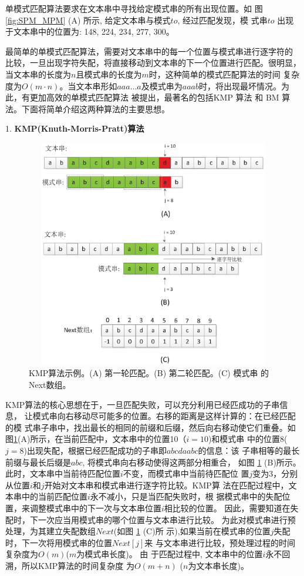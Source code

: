 单模式匹配算法要求在文本串中寻找给定模式串的所有出现位置。如
图 \ref{fig:SPM_MPM} (A) 所示, 给定文本串与模式$to$, 经过匹配发现，模
式串$to$ 出现于文本串中的位置为: 148, 224, 234, 277, 300。

最简单的单模式匹配算法，需要对文本串中的每一个位置与模式串进行逐字符的
比较，一旦出现字符失配，将直接移动到文本串的下一个位置进行匹配。很明显，
当文本串的长度为$n$且模式串的长度为$m$时，这种简单的模式匹配算法的时间
复杂度为$O(m \cdot
n)$。当文本串形如$aaa \dots
a$及模式串为$aaab$时，将出现最坏情况。为此，有更加高效的单模式匹配算法
被提出，最著名的包括KMP \cite{Knuth1977}算法 和 BM \cite{Boyer1977} 算
法。下面将简单介绍这两种算法的主要思想。

1. \textbf{KMP(Knuth-Morris-Pratt)算法}

\begin{figure}[H]
  \centering
  \includegraphics[height=10cm ,width=12cm]{figures/1_Introduction/KMP.eps}
  \caption{KMP算法示例。(A) 第一轮匹配。(B) 第二轮匹配。(C) 模式串
    的Next数组。}
  \label{fig:KMP}
\end{figure}

KMP算法的核心思想在于，一旦匹配失败，可以充分利用已经匹成功的子串信息，
让模式串向右移动尽可能多的位置。右移的距离是这样计算的：在已经匹配的模
式串子串中，找出最长的相同的前缀和后缀，然后向右移动使它们重叠。如
图\ref{fig:KMP}(A)所示，在当前匹配中，文本串中的位置10（$i=10$)和模式串
中的位置8($j=8$)出现失配，根据已经匹配成功的子串即$abcdaabc$的信息：该
子串相等的最长前缀与最长后缀是$abc$, 将模式串向右移动使得这两部分相重合，
如图 \ref{fig:KMP}
(B)所示。此时，文本串中当前待匹配位置$i$不变，而模式串中当前待匹配位
置$j$变为3，分别从位置$i$和$j$开始对文本串和模式串进行逐字符比较。KMP算
法在匹配过程中，文本串中的当前匹配位置$i$永不减小，只是当匹配失败时，根
据模式串中的失配位置，来调整模式串中的下一次与文本串位置$i$相比较的位置。
因此，需要知道在失配时，下一次应当用模式串的哪个位置与文本串进行比较。
为此对模式串进行预处理，为其建立失配数组$Next$(如图 \ref{fig:KMP} (C)所
示),如果当前在模式串的位置$j$失配时，下一次将用模式串的位置$Next[j]$来
与文本串进行比较，预处理过程的时间复杂度为$O(m)$($m$为模式串长度)。 由
于匹配过程中, 文本串中的位置$i$永不回溯，所以KMP算法的时间复杂度
为$O(m+n)$ ($n$为文本串长度)。

